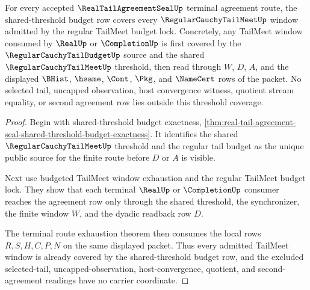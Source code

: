 \begin{theorem}
\label{thm:real-tail-agreement-seal-root-budget-threshold-coverage}
For every accepted $\RealTailAgreementSealUp$ terminal agreement route, the shared-threshold budget row covers every $\RegularCauchyTailMeetUp$ window admitted by the regular TailMeet budget lock. Concretely, any TailMeet window consumed by $\RealUp$ or $\CompletionUp$ is first covered by the $\RegularCauchyTailBudgetUp$ source and the shared $\RegularCauchyTailMeetUp$ threshold, then read through $W$, $D$, $A$, and the displayed $\BHist$, $\hsame$, $\Cont$, $\Pkg$, and $\NameCert$ rows of the packet. No selected tail, uncapped observation, host convergence witness, quotient stream equality, or second agreement row lies outside this threshold coverage.
\end{theorem}
\begin{proof}
Begin with shared-threshold budget exactness, \autoref{thm:real-tail-agreement-seal-shared-threshold-budget-exactness}. It identifies the shared $\RegularCauchyTailMeetUp$ threshold and the regular tail budget as the unique public source for the finite route before $D$ or $A$ is visible.

Next use budgeted TailMeet window exhaustion and the regular TailMeet budget lock. They show that each terminal $\RealUp$ or $\CompletionUp$ consumer reaches the agreement row only through the shared threshold, the synchronizer, the finite window $W$, and the dyadic readback row $D$.

The terminal route exhaustion theorem then consumes the local rows $R,S,H,C,P,N$ on the same displayed packet. Thus every admitted TailMeet window is already covered by the shared-threshold budget row, and the excluded selected-tail, uncapped-observation, host-convergence, quotient, and second-agreement readings have no carrier coordinate.
\end{proof}

